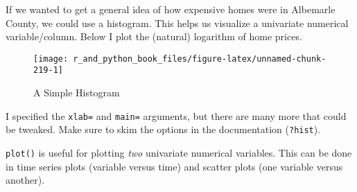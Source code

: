 \documentclass[12pt,krantz2]{krantz}
\makeatletter
\newenvironment{Shaded}{\begin{snugshade}}{\end{snugshade}}
\newcommand{\DataTypeTok}[1]{\textcolor[rgb]{0.27,0.27,0.27}{#1}}
\newcommand{\DecValTok}[1]{\textcolor[rgb]{0.06,0.06,0.06}{#1}}
\newcommand{\KeywordTok}[1]{\textcolor[rgb]{0.27,0.27,0.27}{\textbf{#1}}}
\newcommand{\NormalTok}[1]{#1}
\newcommand{\OperatorTok}[1]{\textcolor[rgb]{0.43,0.43,0.43}{\textbf{#1}}}
\newcommand{\StringTok}[1]{\textcolor[rgb]{0.5,0.5,0.5}{#1}}
\newenvironment{kframe}{%
\medskip{}
\setlength{\fboxsep}{.8em}
 \def\at@end@of@kframe{}%
 \ifinner\ifhmode%
  \def\at@end@of@kframe{\end{minipage}}%
  \begin{minipage}{\columnwidth}%
 \fi\fi%
 \def\FrameCommand##1{\hskip\@totalleftmargin \hskip-\fboxsep
 \colorbox{shadecolor}{##1}\hskip-\fboxsep
     \hskip-\linewidth \hskip-\@totalleftmargin \hskip\columnwidth}%
 \MakeFramed {\advance\hsize-\width
   \@totalleftmargin\z@ \linewidth\hsize
   \@setminipage}}%
 {\par\unskip\endMakeFramed%
 \at@end@of@kframe}
\renewenvironment{Shaded}{\begin{kframe}}{\end{kframe}}
\makeatother
\begin{document}
If we wanted to get a general idea of how expensive homes were in Albemarle County, we could use a histogram. This helps us visualize a univariate numerical variable/column. Below I plot the (natural) logarithm of home prices.

\begin{Shaded}
\end{Shaded}

\begin{figure}

{\centering \texttt{[image: r\_and\_python\_book\_files/figure-latex/unnamed-chunk-219-1]} 

}

\caption{A Simple Histogram}\label{fig:unnamed-chunk-219}
\end{figure}

I specified the \texttt{xlab=} and \texttt{main=} arguments, but there are many more that could be tweaked. Make sure to skim the options in the documentation (\texttt{?hist}).

\texttt{plot()} is useful for plotting \emph{two} univariate numerical variables. This can be done in time series plots (variable versus time) and scatter plots (one variable versus another).

\begin{Shaded}
\end{Shaded}
\end{document}
